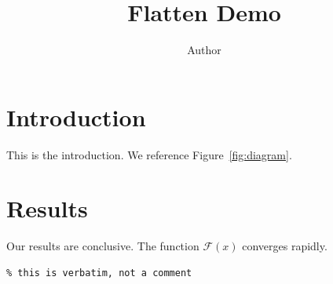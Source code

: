 \documentclass{article}
\title{Flatten Demo}
\author{Author}
\begin{document}
\maketitle


\section{Introduction}
This is the introduction. We reference Figure~\ref{fig:diagram}.

\newcommand{\specialFunc}{\mathcal{F}}



\section{Results}
Our results are conclusive. The function \(\specialFunc(x)\) converges rapidly.
\begin{verbatim}
% this is verbatim, not a comment

\end{verbatim}




\end{document}
